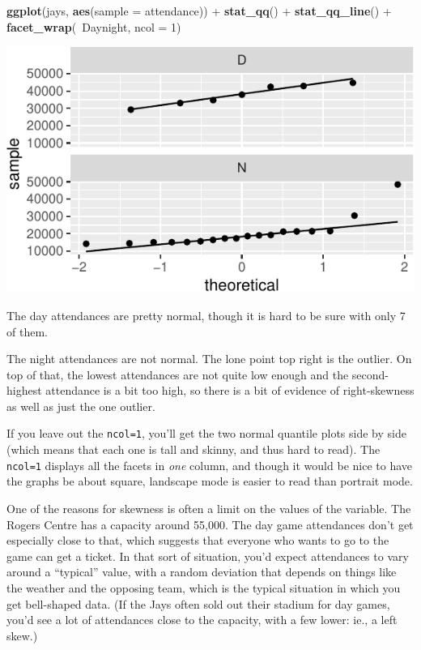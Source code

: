 \documentclass[]{tufte-book}
\newenvironment{Shaded}{}{}
\newcommand{\DataTypeTok}[1]{\textcolor[rgb]{0.56,0.13,0.00}{#1}}
\newcommand{\DecValTok}[1]{\textcolor[rgb]{0.25,0.63,0.44}{#1}}
\newcommand{\KeywordTok}[1]{\textcolor[rgb]{0.00,0.44,0.13}{\textbf{#1}}}
\newcommand{\NormalTok}[1]{#1}
\newcommand{\OperatorTok}[1]{\textcolor[rgb]{0.40,0.40,0.40}{#1}}
\newcommand{\StringTok}[1]{\textcolor[rgb]{0.25,0.44,0.63}{#1}}
\theoremstyle{definition}
\theoremstyle{definition}
\theoremstyle{definition}
\theoremstyle{remark}
\begin{document}
\begin{Shaded}
\begin{Highlighting}[]
\KeywordTok{ggplot}\NormalTok{(jays, }\KeywordTok{aes}\NormalTok{(}\DataTypeTok{sample =}\NormalTok{ attendance)) }\OperatorTok{+}\StringTok{ }\KeywordTok{stat_qq}\NormalTok{() }\OperatorTok{+}\StringTok{ }
\StringTok{    }\KeywordTok{stat_qq_line}\NormalTok{() }\OperatorTok{+}\StringTok{ }\KeywordTok{facet_wrap}\NormalTok{(}\OperatorTok{~}\NormalTok{Daynight, }\DataTypeTok{ncol =} \DecValTok{1}\NormalTok{)}
\end{Highlighting}
\end{Shaded}

\includegraphics{11-tidying-and-selecting-data_files/figure-latex/unnamed-chunk-13-1}

The day attendances are pretty normal, though it is hard to be sure with
only 7 of them.

The night attendances are not normal. The lone point top right is the
outlier. On top of that, the lowest attendances are not quite low enough
and the second-highest attendance is a bit too high, so there is a bit
of evidence of right-skewness as well as just the one outlier.

If you leave out the \texttt{ncol=1}, you'll get the two normal quantile
plots side by side (which means that each one is tall and skinny, and
thus hard to read). The \texttt{ncol=1} displays all the facets in
\emph{one} column, and though it would be nice to have the graphs be
about square, landscape mode is easier to read than portrait mode.

One of the reasons for skewness is often a limit on the values of the
variable. The Rogers Centre has a capacity around 55,000. The day game
attendances don't get especially close to that, which suggests that
everyone who wants to go to the game can get a ticket. In that sort of
situation, you'd expect attendances to vary around a ``typical'' value,
with a random deviation that depends on things like the weather and the
opposing team, which is the typical situation in which you get
bell-shaped data. (If the Jays often sold out their stadium for day
games, you'd see a lot of attendances close to the capacity, with a few
lower: ie., a left skew.)
\end{document}
